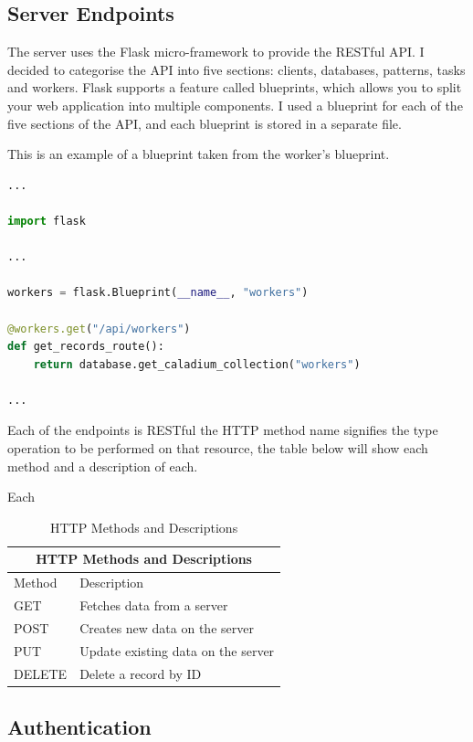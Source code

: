 \subsection{Server Endpoints}
The server uses the Flask micro-framework to provide the RESTful API.
I decided to categorise the API into five sections:
clients, databases, patterns, tasks and workers.
Flask supports a feature called blueprints,
which allows you to split your web application into multiple components.
I used a blueprint for each of the five sections of the API,
and each blueprint is stored in a separate file.

This is an example of a blueprint taken from the worker's blueprint.
\begin{lstlisting}[language=python]
...

import flask

...

workers = flask.Blueprint(__name__, "workers")

@workers.get("/api/workers")
def get_records_route():
    return database.get_caladium_collection("workers")

...
\end{lstlisting}

Each of the endpoints is RESTful the HTTP method name signifies the type operation to be performed on that resource, the table below will show each method and a description of each.

Each

\begin{table}
    \centering
    \begin{tabular}{|p{2cm}|p{6cm}|}
        \hline
        \multicolumn{2}{|c|}{HTTP Methods and Descriptions} \\
        \hline
        Method & Description\\
        \hline
        GET & Fetches data from a server\\
        \hline
        POST & Creates new data on the server\\
        \hline
        PUT & Update existing data on the server\\
        \hline
        DELETE & Delete a record by ID\\
        \hline
    \end{tabular}
    \caption{HTTP Methods and Descriptions}
    \label{table:httpmethods}
\end{table}

\subsection{Authentication}

